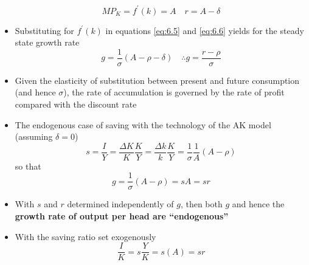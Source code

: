 \documentclass[a4paper,twoside]{article}
\numberwithin{equation}{section}
\numberwithin{figure}{section}
\begin{document}
\begin{itemize}
	\begin{equation}
		MP_K = f^\prime(k) = A \quad r = A -\delta \label{eq:6.8}
	\end{equation}
	\item Substituting for \( f^\prime(k) \) in equations \ref{eq:6.5} and \ref{eq:6.6} yields for the steady state growth rate
	\begin{equation}
		g = \frac{1}{\sigma} (A -\rho -\delta) \quad \therefore g = \frac{r-\rho}{\sigma} \label{eq:6.9}
	\end{equation}
	\item Given the elasticity of substitution between present and future consumption (and hence \( \sigma \)), the rate of accumulation is governed by the rate of profit compared with the discount rate
	\item The endogenous case of saving with the technology of the AK model (assuming \( \delta = 0 \))
	\begin{equation}
		s = \frac{I}{Y} = \frac{\Delta K}{K}\frac{K}{Y} = \frac{\Delta k}{k}\frac{K}{Y} = \frac{1}{\sigma}\frac{1}{A}(A -\rho)
	\end{equation}
	so that
	\begin{equation}
		g = \frac{1}{\sigma} (A - \rho) = sA = sr \label{eq:6.11}
	\end{equation}
	\item With \( s \) and \( r \) determined independently of \( g \), then both \( g \) and hence the \textbf{growth rate of output per head are ``endogenous''}
	\item With the saving ratio set exogenously
	\begin{equation}
		\frac{I}{K} = s \frac{Y}{K} = s(A) = sr \label{eq:6.12}
	\end{equation}
\end{itemize}
\end{document}
